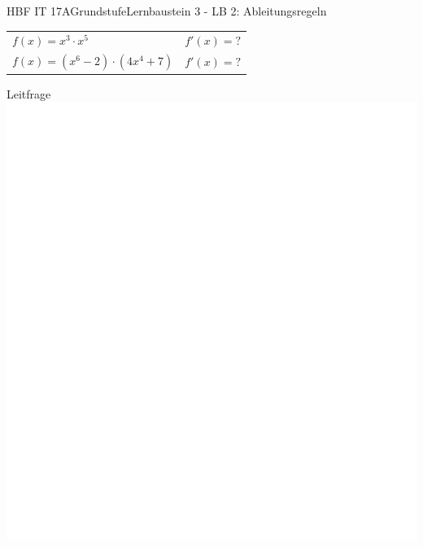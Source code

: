 \documentclass[oneside,openany,headings=optiontotoc,11pt,numbers=noenddot]{scrreprt}
\begin{document}
	\begin{worksheet}{HBF IT 17A}{Grundstufe}{Lernbaustein 3 - LB 2: Ableitungsregeln}
		\begin{framed}
			\begin{tabularx}{\textwidth}{XX}
				\(f(x) = x^3\cdot x^5\) & \(f'(x) = ? \)\\
				\(f(x) = (x^6-2)\cdot(4x^4+7)\) & \(f'(x) = ?\)
			\end{tabularx}
		\end{framed}
		\begin{framed}
			\noindent
			\tiny{\color{codegray}Leitfrage}\\
			\includegraphics[scale=0.25]{../empty.jpg}
		\end{framed}
		\begin{framed}

\end{framed}
\end{worksheet}
\end{document}
